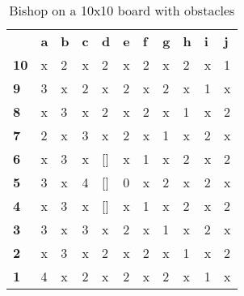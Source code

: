 \documentclass{article}
\begin{document}
\begin{table}[H]
\centering
\caption{Bishop on a 10x10 board with obstacles}
\label{my-label}
\begin{tabular}{lllllllllll}
                                 & \textbf{a} & \textbf{b} & \textbf{c} & \textbf{d} & \textbf{e} & \textbf{f} & \textbf{g} & \textbf{h} & \textbf{i} & \textbf{j} \\ \cline{2-11} 
\multicolumn{1}{l|}{\textbf{10}} & x          & 2          & x          & 2          & x          & 2          & x          & 2          & x          & 1          \\
\multicolumn{1}{l|}{\textbf{9}}  & 3          & x          & 2          & x          & 2          & x          & 2          & x          & 1          & x          \\
\multicolumn{1}{l|}{\textbf{8}}  & x          & 3          & x          & 2          & x          & 2          & x          & 1          & x          & 2          \\
\multicolumn{1}{l|}{\textbf{7}}  & 2          & x          & 3          & x          & 2          & x          & 1          & x          & 2          & x          \\
\multicolumn{1}{l|}{\textbf{6}}  & x          & 3          & x          & {[}{]}     & x          & 1          & x          & 2          & x          & 2          \\
\multicolumn{1}{l|}{\textbf{5}}  & 3          & x          & 4          & {[}{]}     & 0          & x          & 2          & x          & 2          & x          \\
\multicolumn{1}{l|}{\textbf{4}}  & x          & 3          & x          & {[}{]}     & x          & 1          & x          & 2          & x          & 2          \\
\multicolumn{1}{l|}{\textbf{3}}  & 3          & x          & 3          & x          & 2          & x          & 1          & x          & 2          & x          \\
\multicolumn{1}{l|}{\textbf{2}}  & x          & 3          & x          & 2          & x          & 2          & x          & 1          & x          & 2          \\
\multicolumn{1}{l|}{\textbf{1}}  & 4          & x          & 2          & x          & 2          & x          & 2          & x          & 1          & x         
\end{tabular}
\end{table}
\end{document}
